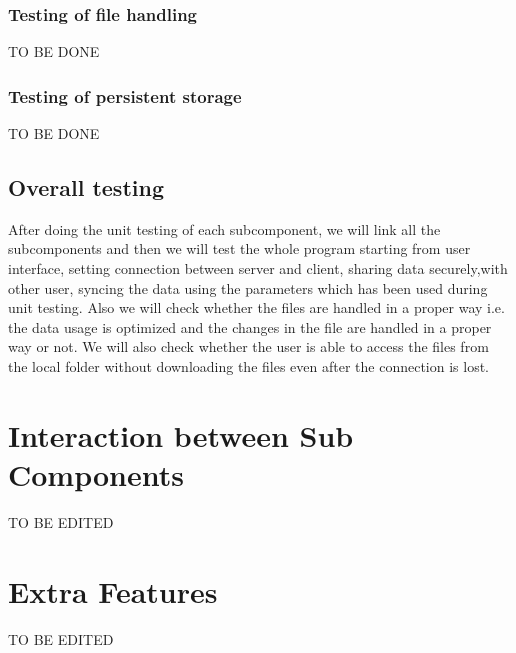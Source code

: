 \documentclass{article}
\begin{document}
\subsubsection{Testing of file handling}
TO BE DONE
\subsubsection{Testing of persistent storage}
TO BE DONE
\subsection{Overall testing}
After doing the unit testing of each subcomponent, we will link all the subcomponents and then we will test the whole program starting from user interface, setting connection between server and client, sharing data securely,with other user, syncing the data using the parameters which has been used during unit testing. Also we will check whether the files are handled in a proper way i.e. the data usage is optimized and the changes in the file are handled in a proper way or not. We will also check whether the user is able to access the files from the local folder without downloading the files even after the connection is lost.
\section{Interaction between Sub Components}
TO BE EDITED
\section{Extra Features}
TO BE EDITED
\end{document}
